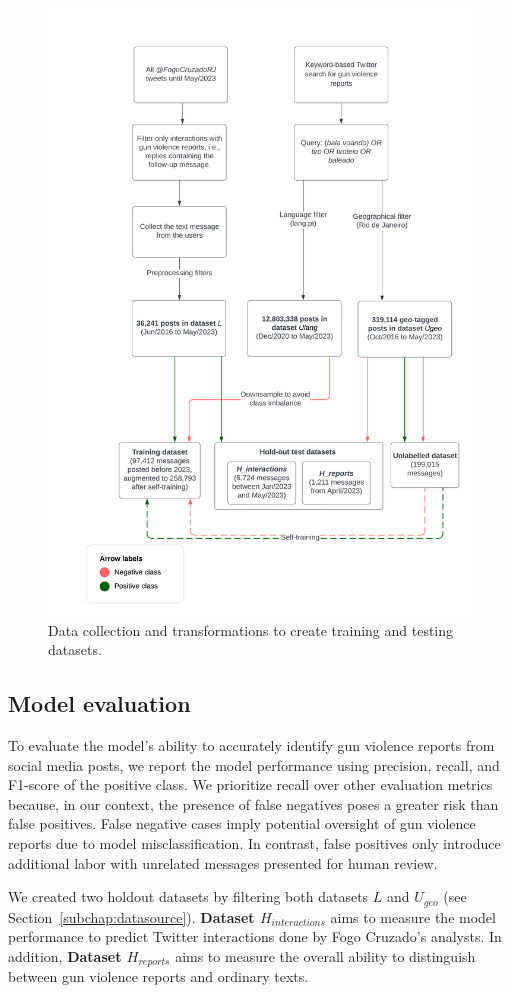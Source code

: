 \documentclass[11pt,letterpaper]{article}
\begin{document}
\begin{figure}[htb]
    \centering
    \includegraphics[width=0.7\linewidth]{figs/Datasets.png}
    \caption{Data collection and transformations to create training and testing datasets.}
    \label{app:datasets}
\end{figure}

\subsection{Model evaluation}
To evaluate the model's ability to accurately identify gun violence reports from social media posts, we report the model performance using precision, recall, and F1-score of the positive class. We prioritize recall over other evaluation metrics because, in our context, the presence of false negatives poses a greater risk than false positives. False negative cases imply potential oversight of gun violence reports due to model misclassification. In contrast, false positives only introduce additional labor with unrelated messages presented for human review. 

We created two holdout datasets by filtering both datasets $L$ and $ U_{geo} $ (see Section~\ref{subchap:datasource}). \textbf{Dataset $ H_{interactions} $} aims to measure the model performance to predict Twitter interactions done by Fogo Cruzado's analysts. In addition, \textbf{Dataset $ H_{reports} $} aims to measure the overall ability to distinguish between gun violence reports and ordinary texts.  
\end{document}
